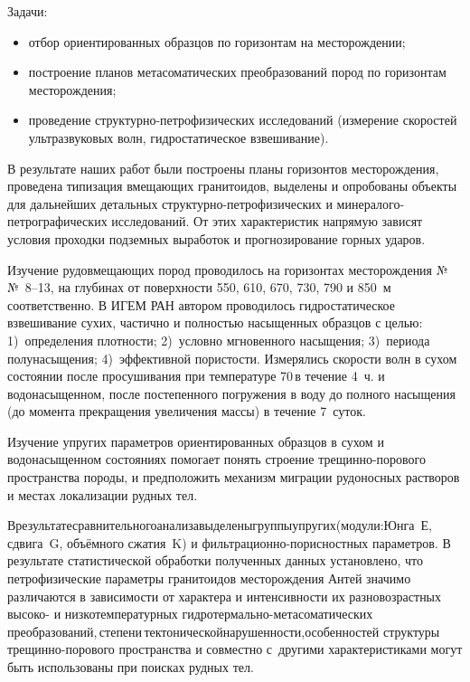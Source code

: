 Задачи:
\begin{itemize}[noitemsep]\vspace{-8pt}
  \item отбор ориентированных образцов по горизонтам на месторождении;
  \item построение планов метасоматических преобразований пород по горизонтам месторождения;
  \item проведение структурно-петрофизических исследований (измерение скоростей ультразвуковых волн, гидростатическое взвешивание).
\end{itemize}
 \vspace{-8pt}

В результате наших работ были построены планы горизонтов месторождения, проведена типизация вмещающих гранитоидов, выделены и опробованы объекты для дальнейших детальных структурно-петрофизических и минералого-петрографических исследований. От этих характеристик напрямую зависят условия проходки подземных выработок и прогнозирование горных ударов.

Изучение рудовмещающих пород проводилось на горизонтах месторождения №№~8--13, на глубинах от поверхности 550, 610, 670, 730, 790 и 850~м соответственно. В ИГЕМ РАН автором проводилось гидростатическое взвешивание сухих, частично и полностью насыщенных образцов с целью: 1)~определения плотности; 2)~условно мгновенного насыщения; 3)~периода полунасыщения; 4)~эффективной пористости.
Измерялись скорости волн в сухом состоянии после просушивания при температуре 70\,\dgc в течение 4~ч. и водонасыщенном, после постепенного погружения в воду до полного насыщения (до момента прекращения увеличения массы) в течение 7~суток.

Изучение упругих параметров ориентированных образцов в сухом и водонасыщенном состояниях помогает понять строение трещинно-порового пространства породы, и предположить механизм миграции рудоносных растворов и местах локализации рудных тел.

В\;\;результате\;\;сравнительного\;\;анализа\;\;выделены\;\;группы\;\;упругих\;\;(модули:\;\;Юнга~Е, сдвига~G, объёмного сжатия~K) и фильтрационно-порисностных параметров. В результате статистической обработки полученных данных установлено, что петрофизические параметры гранитоидов месторождения Антей значимо различаются в зависимости от характера и интенсивности их разновозрастных высоко- и низкотемпературных гидротермально-метасоматических\;\;\,преобразований,\;\;\,степени\;\;\,тектонической\;\;нарушенности,\;\;особенностей структуры трещинно-порового пространства и совместно с~другими характеристиками могут быть использованы при поисках рудных тел.


